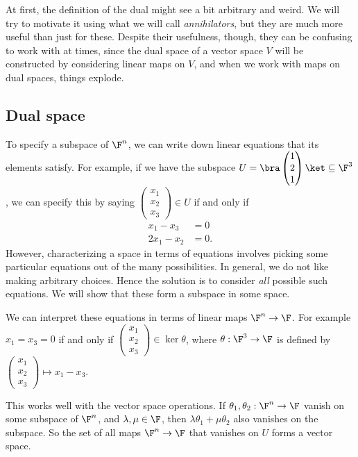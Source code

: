 \documentclass[a4paper]{article}
\begin{document}
At first, the definition of the dual might see a bit arbitrary and weird. We will try to motivate it using what we will call \emph{annihilators}, but they are much more useful than just for these. Despite their usefulness, though, they can be confusing to work with at times, since the dual space of a vector space $V$ will be constructed by considering linear maps on $V$, and when we work with maps on dual spaces, things explode.

\subsection{Dual space}
To specify a subspace of $\F^n$, we can write down linear equations that its elements satisfy. For example, if we have the subspace $U = \bra \begin{pmatrix} 1\\2\\1 \end{pmatrix}\ket\subseteq \F^3$, we can specify this by saying $\begin{pmatrix}x_1\\ x_2\\ x_3\end{pmatrix} \in U$ if and only if
\begin{align*}
  x_1 - x_3 &= 0\\
  2x_1 - x_2 &= 0.
\end{align*}
However, characterizing a space in terms of equations involves picking some particular equations out of the many possibilities. In general, we do not like making arbitrary choices. Hence the solution is to consider \emph{all} possible such equations. We will show that these form a subspace in some space.

We can interpret these equations in terms of linear maps $\F^n \to \F$. For example $x_1 = x_3 = 0$ if and only if $\begin{pmatrix}x_1\\x_2\\x_3\end{pmatrix} \in \ker \theta$, where $\theta: \F^3 \to \F$ is defined by $\begin{pmatrix}x_1\\x_2\\x_3\end{pmatrix} \mapsto x_1 - x_3$.

This works well with the vector space operations. If $\theta_1, \theta_2: \F^n \to \F$ vanish on some subspace of $\F^n$, and $\lambda, \mu\in \F$, then $\lambda \theta_1 + \mu \theta_2$ also vanishes on the subspace. So the set of all maps $\F^n \to \F$ that vanishes on $U$ forms a vector space.
\end{document}
